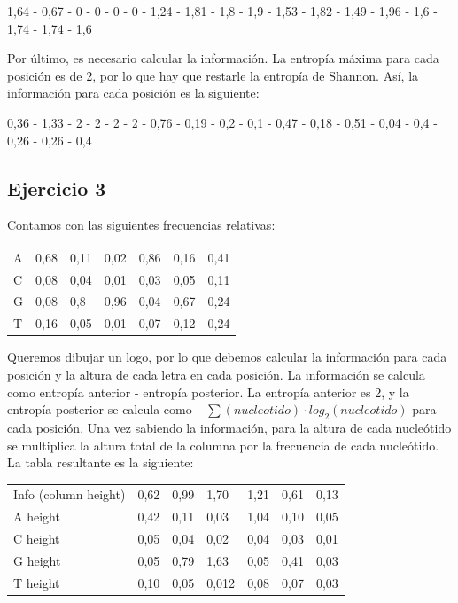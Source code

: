 1,64 - 0,67 - 0 - 0 - 0 - 0 - 1,24 - 1,81 - 1,8 - 1,9 - 1,53 - 1,82 - 1,49 - 1,96 - 1,6 - 1,74 - 1,74 - 1,6


Por último, es necesario calcular la información. La entropía máxima para cada posición es de 2, por lo que hay que restarle la entropía de Shannon. Así, la información para cada posición es la siguiente: 

0,36 - 1,33 - 2 - 2 - 2 - 2 - 0,76 - 0,19 - 0,2 - 0,1 - 0,47 - 0,18 - 0,51 - 0,04 - 0,4 - 0,26 - 0,26 - 0,4


\subsection{Ejercicio 3}
Contamos con las siguientes frecuencias relativas:
\begin{table}[h]
\centering
\begin{tabular}{l | llllll}
A & 0,68 & 0,11 & 0,02 & 0,86 & 0,16 & 0,41 \\
C & 0,08 & 0,04 & 0,01 & 0,03 & 0,05 & 0,11 \\
G & 0,08 & 0,8  & 0,96 & 0,04 & 0,67 & 0,24 \\
T & 0,16 & 0,05 & 0,01 & 0,07 & 0,12 & 0,24
\end{tabular}
\end{table}

Queremos dibujar un logo, por lo que debemos calcular la información para cada posición y la altura de cada letra en cada posición. La información se calcula como entropía anterior - entropía posterior. La entropía anterior es 2, y la entropía posterior se calcula como $- \sum (nucleotido) \cdot log_2 (nucleotido)$ para cada posición. Una vez sabiendo la información, para la altura de cada nucleótido se multiplica la altura total de la columna por la frecuencia de cada nucleótido. La tabla resultante es la siguiente:
\begin{table}[htbp]
\centering
\begin{tabular}{l | llllll}
Info (column height) & 0,62 & 0,99 & 1,70 & 1,21 & 0,61 & 0,13 \\
A height & 0,42 & 0,11 & 0,03 & 1,04 & 0,10 & 0,05 \\
C height & 0,05 & 0,04 & 0,02 & 0,04 & 0,03 & 0,01 \\
G height & 0,05 & 0,79 & 1,63  & 0,05 & 0,41 & 0,03 \\
T height & 0,10  & 0,05 & 0,012 & 0,08 & 0,07 & 0,03
\end{tabular}
\end{table}


